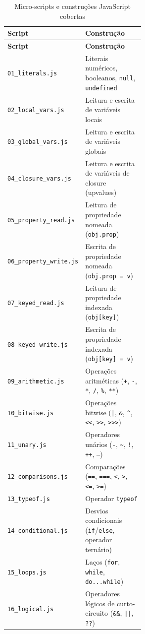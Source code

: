 \begin{longtable}{l p{0.55\linewidth}}
\caption{Micro-scripts e construções JavaScript cobertas}
\label{tab:micro} \\
\toprule
\textbf{Script} & \textbf{Construção} \\
\midrule
\endfirsthead
\toprule
\textbf{Script} & \textbf{Construção} \\
\midrule
\endhead
\bottomrule
\endlastfoot
\texttt{01\_literals.js}       & Literais numéricos, booleanos, \texttt{null}, \texttt{undefined} \\
\texttt{02\_local\_vars.js}    & Leitura e escrita de variáveis locais \\
\texttt{03\_global\_vars.js}   & Leitura e escrita de variáveis globais \\
\texttt{04\_closure\_vars.js}  & Leitura e escrita de variáveis de closure (upvalues) \\
\texttt{05\_property\_read.js} & Leitura de propriedade nomeada (\texttt{obj.prop}) \\
\texttt{06\_property\_write.js}& Escrita de propriedade nomeada (\texttt{obj.prop = v}) \\
\texttt{07\_keyed\_read.js}    & Leitura de propriedade indexada (\texttt{obj[key]}) \\
\texttt{08\_keyed\_write.js}   & Escrita de propriedade indexada (\texttt{obj[key] = v}) \\
\texttt{09\_arithmetic.js}     & Operações aritméticas (\texttt{+}, \texttt{-}, \texttt{*}, \texttt{/}, \texttt{\%}, \texttt{**}) \\
\texttt{10\_bitwise.js}        & Operações bitwise (\texttt{|}, \texttt{\&}, \texttt{\textasciicircum}, \texttt{<<}, \texttt{>>}, \texttt{>>>}) \\
\texttt{11\_unary.js}          & Operadores unários (\texttt{-}, \texttt{\textasciitilde}, \texttt{!}, \texttt{++}, \texttt{--}) \\
\texttt{12\_comparisons.js}    & Comparações (\texttt{==}, \texttt{===}, \texttt{<}, \texttt{>}, \texttt{<=}, \texttt{>=}) \\
\texttt{13\_typeof.js}         & Operador \texttt{typeof} \\
\texttt{14\_conditional.js}    & Desvios condicionais (\texttt{if}/\texttt{else}, operador ternário) \\
\texttt{15\_loops.js}          & Laços (\texttt{for}, \texttt{while}, \texttt{do...while}) \\
\texttt{16\_logical.js}        & Operadores lógicos de curto-circuito (\texttt{\&\&}, \texttt{||}, \texttt{??}) \\

\end{longtable}
